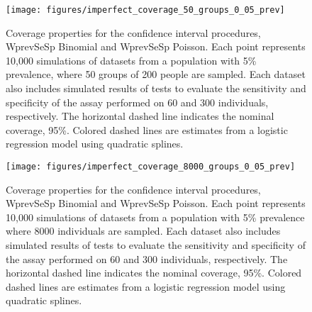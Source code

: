 \begin{figure}
\centering
\texttt{[image: figures/imperfect\_coverage\_50\_groups\_0\_05\_prev]}
\caption{Coverage properties for the confidence interval procedures, WprevSeSp Binomial and WprevSeSp Poisson.
Each point represents 10,000 simulations of datasets from a population with 5\% prevalence, where 50 groups of 200 people are sampled.
Each dataset also includes simulated results of tests to evaluate the sensitivity and specificity of the assay performed on 60 and 300 individuals, respectively.
The horizontal dashed line indicates the nominal coverage, 95\%.
Colored dashed lines are estimates from a logistic regression model using quadratic splines.}
\label{fig:imperfect_coverage_50_groups_0_05_prev}
\end{figure}

\begin{figure}
\centering
\texttt{[image: figures/imperfect\_coverage\_8000\_groups\_0\_05\_prev]}
\caption{Coverage properties for the confidence interval procedures, WprevSeSp Binomial and WprevSeSp Poisson.
Each point represents 10,000 simulations of datasets from a population with 5\% prevalence where 8000 individuals are sampled.
Each dataset also includes simulated results of tests to evaluate the sensitivity and specificity of the assay performed on 60 and 300 individuals, respectively.
The horizontal dashed line indicates the nominal coverage, 95\%.
Colored dashed lines are estimates from a logistic regression model using quadratic splines.}
\label{fig:imperfect_coverage_8000_groups_0_05_prev}
\end{figure}


